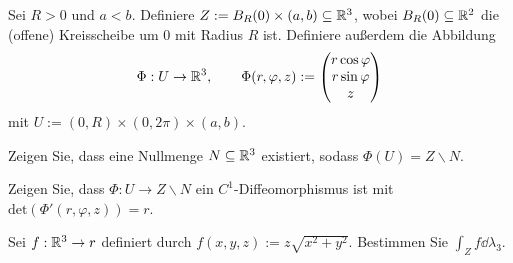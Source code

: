 \begin{Problem}
	Sei $R>0$ und $a<b$. Definiere $Z:=B_R(0)\times (a,b)\subseteq \mathbb{R}^3$, wobei $B_R(0)\subseteq \mathbb{R}^2$ die (offene) Kreisscheibe um $0$ mit Radius $R$ ist. Definiere außerdem die Abbildung
	\[
	\Phi:U\to \mathbb{R}^3, \qquad \Phi(r,\varphi,z):=\begin{pmatrix} r\cos\varphi \\ r\sin\varphi \\ z \end{pmatrix} 
\]
mit $U:=(0,R)\times (0,2\pi)\times (a,b)$.
\begin{parts}
	\item Zeigen Sie, dass eine Nullmenge $N\subseteq \mathbb{R}^3$ existiert, sodass $\Phi(U)=Z\backslash N$.
	\item Zeigen Sie, dass $\Phi:U\to Z \backslash N$ ein $C^1$-Diffeomorphismus ist mit $\text{det}(\Phi'(r,\varphi,z))=r$.
	\item Sei $f:\mathbb{R}^3\to r$ definiert durch $f(x,y,z):=z\sqrt{x^2+y^2} $. Bestimmen Sie $\int_Z f\dd{\lambda_3}$.
\end{parts}
\end{Problem}

